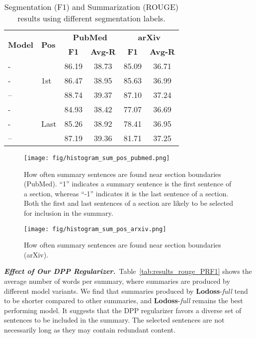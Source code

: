 \documentclass[11pt]{article}
\begin{document}
\begin{table}[!t]
\setlength{\tabcolsep}{4.5pt}
\renewcommand{\arraystretch}{1.1}
\centering
\footnotesize
\begin{footnotesize}
\begin{tabular}{|l|l|cc|cc|}
\hline
\multirow{2}{3em}{\textbf{Model}}& \multirow{2}{1.8em}{\textbf{Pos}} & \multicolumn{2}{c|}{\textbf{PubMed}} & \multicolumn{2}{c|}{\textbf{arXiv}}\\
 &  & \textbf{F1} & \textbf{Avg-R} & \textbf{F1} & \textbf{Avg-R}  \\
\hline
\hline
- & \multirow{3}{1.0em}{1st} & 86.19 & 38.73 & 85.09 & 36.71 \\
- & & 86.47 & 38.95 & 85.63 & 36.99 \\
-- & & 88.74 & 39.37 & 87.10 & 37.24 \\
\hline
\hline
- & \multirow{3}{1.0em}{Last} & 84.93 & 38.42 & 77.07 & 36.69 \\
- &  & 85.26 & 38.92 & 78.41 & 36.95 \\
-- & & 87.19 & 39.36 & 81.71 & 37.25 \\
\hline
\end{tabular}
\end{footnotesize}
\caption{Segmentation (F1) and Summarization (ROUGE) results using different segmentation labels.}
\label{tab:seg_rouge}
\vspace{-0.1in}
\end{table}


\begin{figure}[!t]	
\centering
\texttt{[image: fig/histogram\_sum\_pos\_pubmed.png]}    \vspace{-0.25in}
\caption{How often summary sentences are found near section boundaries (PubMed). 
``1'' indicates a summary sentence is the first sentence of a section,
whereas ``-1'' indicates it is the last sentence of a section.
Both the first and last sentences of a section are likely to be
selected for inclusion in the summary.
}
\label{fig:rela_sent_pos_pubmed}
\end{figure}

\begin{figure}[!t]	
	\centering
	\texttt{[image: fig/histogram\_sum\_pos\_arxiv.png]}  
	\vspace{-0.25in}
	\caption{How often summary sentences are found near section boundaries (arXiv).}
	\label{fig:rela_sent_pos_arxiv}
\end{figure}


\vspace{0.05in}
\noindent\textbf{\textsl{Effect of Our DPP Regularizer.}}\quad\,
Table~\ref{tab:results_rouge_PRF1} shows the average number of words per summary,
where summaries are produced by different model variants.
We find that summaries produced by \textbf{Lodoss}-\emph{full}
tend to be shorter compared to other summaries,
and \textbf{Lodoss}-\emph{full} remains the best performing model.
It suggests that the DPP regularizer favors a diverse set of sentences to be included in the summary. 
The selected sentences are not necessarily long as they may contain redundant content.
\end{document}
